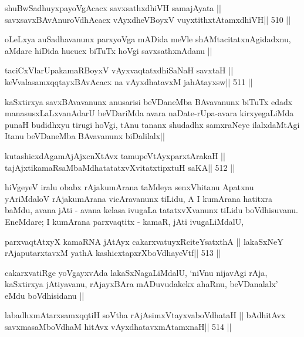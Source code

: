 \begin{shl}
shuBwSadhuyxpayoVgAcacx savxsathxdhiVH samajAyata ||
savxsavxBAvAnuroVdhAcacx vAyxdheVBoyxV vuyxtithxtAtamxdhiVH\hfill || 510 ||
\end{shl}

\begin{artha}
oLeLxya auSadhavanunx parxyoVga mADida meVle shAMtacitatxnAgidadxnu,
aMdare hiDida hucucx biTuTx hoVgi savxsathxnAdanu ||
\end{artha}

\begin{shl}
taciCxVlarUpakamaRBoyxV vAyxvaqtatxdhiSaNaH savxtaH ||
keVvalasamxqqtayxBAvAcacx na vAyxdhatavxM ja{hA}tayxsw\hfill || 511 ||
\end{shl}

\begin{artha}
kaSxtirxya savxBAvavanunx anusarisi beVDaneMba BAvavanunx biTuTx edadx
manasusxLaLxvanAdarU beVDariMda avara naDate-rUpa-avara kirxyegaLiMda
punaH budidhxyu tirugi hoVgi, tAnu tananx shudadhx samxraNeye
ilalxdaMtAgi Itanu beVDaneMba BAvavanunx biDalilalx||
\end{artha}

\begin{shl}
kutashicxdAgamAjAjxcnXtAvx tamupeVtAyxparxtArakaH ||
tajAjxtikamaRsaMbaMdhatatatxvXvitatxtipxtuH saKA\hfill || 512 ||
\end{shl}

\begin{artha}
hiVgeyeV iralu obabx rAjakumArana taMdeya
senxVhitanu Apatxnu yAriMdaloV rAjakumArana vicAravanunx tiLidu, A I
kumArana hatitxra baMdu, avana jAti - avana kelasa ivugaLa
tatatxvXvanunx tiLidu boVdhisuvanu. EneMdare; I kumArana parxvaqtitx -
kamaR, jAti ivugaLiMdalU,  
\end{artha}

\begin{shl}
parxvaqtAtxyX kamaRNA jAtAyx cakarxvatuyxRciteYsatxthA ||
lakaSxNeY rAjaputarxtavxM yathA kashicxtapxrXboVdhayeVtf\hfill || 513 ||
\end{shl}

\begin{artha}
cakarxvatiRge yoVgayxvAda lakaSxNagaLiMdalU, `niVnu nijavAgi rAja,
kaSxtirxya jAtiyavanu, rAjayxBAra mADuvudakekx ahaRnu, beVDanalalx' eMdu
boVdhisidanu ||
\end{artha}

\begin{shl}
labadhxmAtarxsamxqqtiH soV\s tha rAjA\s simxVtayxvaboVdhataH ||
bAdhitAvx savxmasaMboVdhaM hitAvx vAyxdhatavxmAtamxnaH\hfill || 514 ||
\end{shl}

